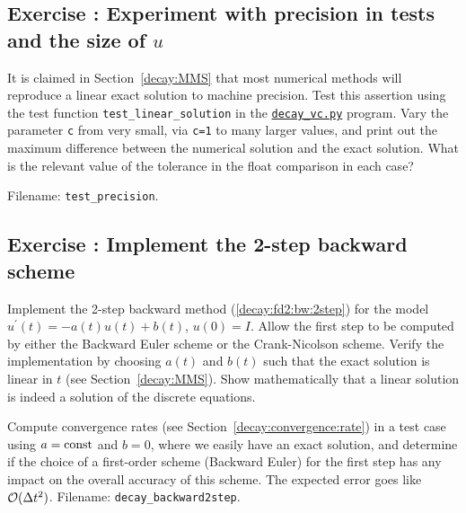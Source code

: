 \documentclass[%
oneside,                 %
final,                   %
10pt]{article}
\newenvironment{doconceexercise}{}{}
\newcounter{doconceexercisecounter}
\begin{document}
\begin{doconceexercise}

\subsection*{Exercise \thedoconceexercisecounter: Experiment with precision in tests and the size of $u$}

\label{decay:fd2:exer:precision}

It is claimed in Section~\ref{decay:MMS} that most numerical methods will
reproduce a linear exact solution to machine precision. Test this
assertion using the test function \Verb!test_linear_solution! in the
\href{{http://tinyurl.com/ofkw6kc/genz/decay_vc.py}}{\nolinkurl{decay_vc.py}} program.
Vary the parameter \texttt{c} from very small, via \texttt{c=1} to many larger values,
and print out the maximum difference between the numerical solution
and the exact solution. What is the relevant value of the tolerance
in the float comparison in each case?


\noindent Filename: \Verb!test_precision!.

\end{doconceexercise}




\begin{doconceexercise}

\subsection*{Exercise \thedoconceexercisecounter: Implement the 2-step backward scheme}

\label{decay:fd2:exer:bw2}

Implement the 2-step backward method (\ref{decay:fd2:bw:2step}) for the
model $u^{\prime}(t) = -a(t)u(t) + b(t)$, $u(0)=I$.  Allow the first step to
be computed by either the Backward Euler scheme or the Crank-Nicolson
scheme. Verify the implementation by choosing $a(t)$ and $b(t)$ such
that the exact solution is linear in $t$ (see Section~\ref{decay:MMS}). Show mathematically that a linear solution is indeed a
solution of the discrete equations.

Compute convergence rates (see Section~\ref{decay:convergence:rate}) in
a test case using $a=\hbox{const}$ and $b=0$, where we easily have an exact
solution, and determine if the choice of a first-order scheme
(Backward Euler) for the first step has any impact on the overall
accuracy of this scheme. The expected error goes like $\mathcal{O}(\Delta t^2)$.
\noindent Filename: \Verb!decay_backward2step!.

\end{doconceexercise}
\end{document}

